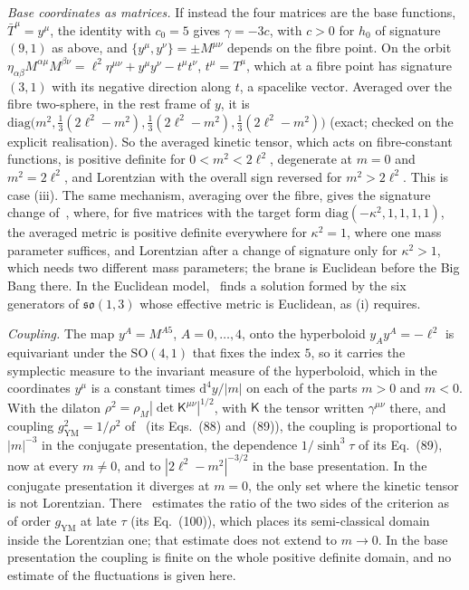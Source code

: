 \emph{Base coordinates as matrices.} If instead the four matrices are the base functions, \(\bar T^\mu=y^\mu\), the identity with \(c_0=5\) gives \(\gamma=-3c\), with \(c>0\) for \(h_0\) of signature \((9,1)\) as above, and \(\{y^\mu,y^\nu\}=\pm M^{\mu\nu}\) depends on the fibre point. On the orbit \(\eta_{\alpha\beta}M^{\alpha\mu}M^{\beta\nu}=\ell^2\eta^{\mu\nu}+y^\mu y^\nu-t^\mu t^\nu\), \(t^\mu=T^\mu\), which at a fibre point has signature \((3,1)\) with its negative direction along \(t\), a spacelike vector. Averaged over the fibre two-sphere, in the rest frame of \(y\), it is \(\mathrm{diag}\bigl(m^2,\tfrac13(2\ell^2-m^2),\tfrac13(2\ell^2-m^2),\tfrac13(2\ell^2-m^2)\bigr)\) (exact; checked on the explicit realisation). So the averaged kinetic tensor, which acts on fibre-constant functions, is positive definite for \(0<m^2<2\ell^2\), degenerate at \(m=0\) and \(m^2=2\ell^2\), and Lorentzian with the overall sign reversed for \(m^2>2\ell^2\). This is case (iii). The same mechanism, averaging over the fibre, gives the signature change of~\cite{Steinacker2018BB}, where, for five matrices with the target form \(\mathrm{diag}(-\kappa^2,1,1,1,1)\), the averaged metric is positive definite everywhere for \(\kappa^2=1\), where one mass parameter suffices, and Lorentzian after a change of signature only for \(\kappa^2>1\), which needs two different mass parameters; the brane is Euclidean before the Big Bang there. In the Euclidean model,~\cite{LiaoMaeta2025} finds a solution formed by the six generators of \(\mathfrak{so}(1,3)\) whose effective metric is Euclidean, as (i) requires.

\emph{Coupling.} The map \(y^A=M^{A5}\), \(A=0,\dots,4\), onto the hyperboloid \(y_Ay^A=-\ell^2\) is equivariant under the \(\mathrm{SO}(4,1)\) that fixes the index \(5\), so it carries the symplectic measure to the invariant measure of the hyperboloid, which in the coordinates \(y^\mu\) is a constant times \(\mathrm d^4y/|m|\) on each of the parts \(m>0\) and \(m<0\). With the dilaton \(\rho^2=\rho_M|\det\mathsf K^{\mu\nu}|^{1/2}\), with \(\mathsf K\) the tensor written \(\gamma^{\mu\nu}\) there, and coupling \(g_{\mathrm{YM}}^2=1/\rho^2\) of~\cite{Steinacker2026Weak} (its Eqs.~(88) and~(89)), the coupling is proportional to \(|m|^{-3}\) in the conjugate presentation, the dependence \(1/\sinh^3\tau\) of its Eq.~(89), now at every \(m\neq0\), and to \(|2\ell^2-m^2|^{-3/2}\) in the base presentation. In the conjugate presentation it diverges at \(m=0\), the only set where the kinetic tensor is not Lorentzian. There~\cite{Steinacker2026Weak} estimates the ratio of the two sides of the criterion as of order \(g_{\mathrm{YM}}\) at late \(\tau\) (its Eq.~(100)), which places its semi-classical domain inside the Lorentzian one; that estimate does not extend to \(m\to0\). In the base presentation the coupling is finite on the whole positive definite domain, and no estimate of the fluctuations is given here.

